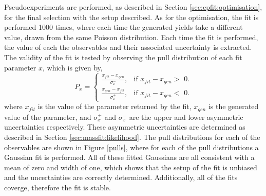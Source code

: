 Pseudoexperiments are performed, as described in Section \ref{sec:cpfit:optimisation}, for the final selection with the setup described. As for the optimisation, the \CP fit is performed 1000 times, where each time the generated yields take a different value, drawn from the same Poisson distribution. Each time the fit is performed, the value of each the \CP observables and their associated uncertainty is extracted. The validity of the fit is tested by observing the pull distribution of each fit parameter $x$, which is given by,
\begin{equation*}
P_x = \begin{cases}
	\frac{x_{fit} - x_{gen}}{\sigma_x^-}, & \text{if $x_{fit} - x_{gen} >$ 0}. \\
	\frac{x_{gen} - x_{fit}}{\sigma_x^+}, & \text{if $x_{fit} - x_{gen} <$ 0}.
	\end{cases}
\end{equation*}
where $x_{fit}$ is the value of the parameter returned by the fit, $x_{gen}$ is the generated value of the parameter, and $\sigma_x^+$ and $\sigma_x^-$ are the upper and lower asymmetric uncertainties respectively. These asymmetric uncertainties are determined as described in Section \ref{sec:massfit:likelihood}. The pull distributions for each of the \CP observables are shown in Figure \ref{pulls}, where for each of the pull distributions a Gaussian fit is performed. All of these fitted Gaussians are all consistent with a mean of zero and width of one, which shows that the setup of the \CP fit is unbiased and the uncertainties are correctly determined. Additionally, all of the fits coverge, therefore the fit is stable. 
 
%

